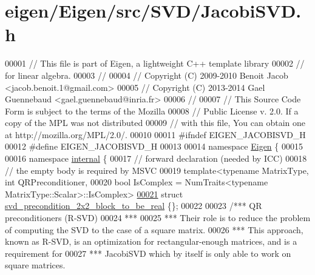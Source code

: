 \hypertarget{eigen_2_eigen_2src_2_s_v_d_2_jacobi_s_v_d_8h_source}{}\section{eigen/\+Eigen/src/\+S\+V\+D/\+Jacobi\+S\+VD.h}
\label{eigen_2_eigen_2src_2_s_v_d_2_jacobi_s_v_d_8h_source}

\begin{DoxyCode}
00001 \textcolor{comment}{// This file is part of Eigen, a lightweight C++ template library}
00002 \textcolor{comment}{// for linear algebra.}
00003 \textcolor{comment}{//}
00004 \textcolor{comment}{// Copyright (C) 2009-2010 Benoit Jacob <jacob.benoit.1@gmail.com>}
00005 \textcolor{comment}{// Copyright (C) 2013-2014 Gael Guennebaud <gael.guennebaud@inria.fr>}
00006 \textcolor{comment}{//}
00007 \textcolor{comment}{// This Source Code Form is subject to the terms of the Mozilla}
00008 \textcolor{comment}{// Public License v. 2.0. If a copy of the MPL was not distributed}
00009 \textcolor{comment}{// with this file, You can obtain one at http://mozilla.org/MPL/2.0/.}
00010 
00011 \textcolor{preprocessor}{#ifndef EIGEN\_JACOBISVD\_H}
00012 \textcolor{preprocessor}{#define EIGEN\_JACOBISVD\_H}
00013 
00014 \textcolor{keyword}{namespace }\hyperlink{namespace_eigen}{Eigen} \{ 
00015 
00016 \textcolor{keyword}{namespace }\hyperlink{namespaceinternal}{internal} \{
00017 \textcolor{comment}{// forward declaration (needed by ICC)}
00018 \textcolor{comment}{// the empty body is required by MSVC}
00019 \textcolor{keyword}{template}<\textcolor{keyword}{typename} MatrixType, \textcolor{keywordtype}{int} QRPreconditioner,
00020          \textcolor{keywordtype}{bool} IsComplex = NumTraits<typename MatrixType::Scalar>::IsComplex>
\hyperlink{struct_eigen_1_1internal_1_1svd__precondition__2x2__block__to__be__real}{00021} \textcolor{keyword}{struct }\hyperlink{struct_eigen_1_1internal_1_1svd__precondition__2x2__block__to__be__real}{svd\_precondition\_2x2\_block\_to\_be\_real} \{\};
00022 
00023 \textcolor{comment}{/*** QR preconditioners (R-SVD)}
00024 \textcolor{comment}{ ***}
00025 \textcolor{comment}{ *** Their role is to reduce the problem of computing the SVD to the case of a square matrix.}
00026 \textcolor{comment}{ *** This approach, known as R-SVD, is an optimization for rectangular-enough matrices, and is a
       requirement for}
00027 \textcolor{comment}{ *** JacobiSVD which by itself is only able to work on square matrices.}

\end{DoxyCode}
